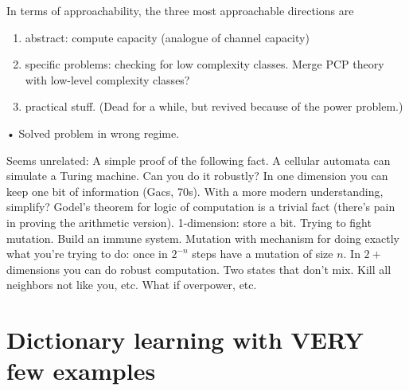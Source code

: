 In terms of approachability, the three most approachable directions are
\begin{enumerate}
\item
abstract: compute capacity (analogue of channel capacity)
\item
specific problems: checking for low complexity classes. Merge PCP theory with low-level complexity classes?
\item 
practical stuff. (Dead for a while, but revived because of the power problem.)
\end{enumerate}•
Solved problem in wrong regime. 




Seems unrelated: A simple proof of the following fact. A cellular automata can simulate a Turing machine. Can you do it robustly? 
In one dimension you can keep one bit of information (Gacs, 70s). With a more modern understanding, simplify?
Godel's theorem for logic of computation is a trivial fact (there's pain in proving the arithmetic version).
1-dimension: store a bit. Trying to fight mutation. Build an immune system. Mutation with mechanism for doing exactly what you're trying to do: once in $2^{-n}$ steps have a mutation of size $n$. In $2+$ dimensions you can do robust computation.
Two states that don't mix. Kill all neighbors not like you, etc. What if overpower, etc.


\section{Dictionary learning with VERY few examples}

